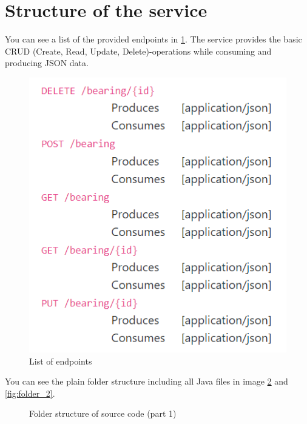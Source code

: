    
    \section{Structure of the service}
        You can see a list of the provided endpoints in \ref{fig:endpoints}. The service provides the basic CRUD (Create, Read, Update, Delete)-operations while consuming and producing JSON data. 

        \begin{figure}[h]
            \centering
            \includegraphics{images/endpoints.png}
            \caption{List of endpoints}
            \label{fig:endpoints}
        \end{figure}

        You can see the plain folder structure including all Java files in image \ref{fig:folder} and \ref{fig:folder_2}.
        \newpage 
        \begin{figure}[h]
            \caption{Folder structure of source code (part 1)}
            \label{fig:folder}
        \end{figure}
        \newpage       
        
